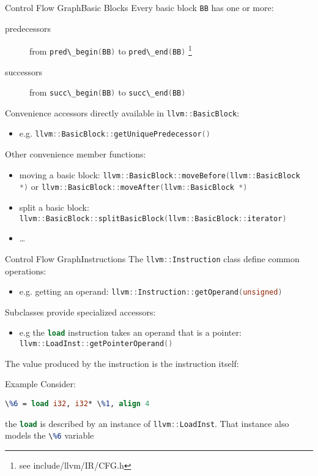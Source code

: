 \documentclass[10pt,mathserif]{beamer}
\newcommand{\cppinline}[1]{\lstinline[language=C++]!#1!}
\newcommand{\llvminline}[1]{\lstinline[language=LLVM]!#1!}
\begin{document}
\begin{frame}{Control Flow Graph}{Basic Blocks}
Every basic block \cppinline{BB} has one or more:

\begin{description}
\item[predecessors] from \cppinline{pred\_begin(BB)} to
      \cppinline{pred\_end(BB)} \footnote{see include/llvm/IR/CFG.h}
\item[successors] from \cppinline{succ\_begin(BB)} to
      \cppinline{succ\_end(BB)}
\end{description}

\vfill
Convenience accessors directly available in \cppinline{llvm::BasicBlock}:

\begin{itemize}
\item e.g. \cppinline{llvm::BasicBlock::getUniquePredecessor()}
\end{itemize}

Other convenience member functions:

\begin{itemize}
\item moving a basic block:
      \cppinline{llvm::BasicBlock::moveBefore(llvm::BasicBlock *)} or
      \cppinline{llvm::BasicBlock::moveAfter(llvm::BasicBlock *)}
\item split a basic block:
      \cppinline{llvm::BasicBlock::splitBasicBlock(llvm::BasicBlock::iterator)}
\item \ldots
\end{itemize}
\end{frame}

\begin{frame}{Control Flow Graph}{Instructions}
The \cppinline{llvm::Instruction} class define common operations:

\begin{itemize}
\item e.g. getting an operand: \cppinline{llvm::Instruction::getOperand(unsigned)}
\end{itemize}

Subclasses provide specialized accessors:

\begin{itemize}
\item e.g the \llvminline{load} instruction takes an operand that is a pointer:
      \cppinline{llvm::LoadInst::getPointerOperand()}
\end{itemize}

\pause
\vfill
The value produced by the instruction is the \alert{instruction itself}:

\begin{block}{Example}
Consider:

\centering
\llvminline{\%6 = load i32, i32* \%1, align 4}

\flushleft
the \llvminline{load} is described
by an instance of \cppinline{llvm::LoadInst}. That instance also models the
\llvminline{\%6} variable
\end{block}
\end{frame}
\end{document}
